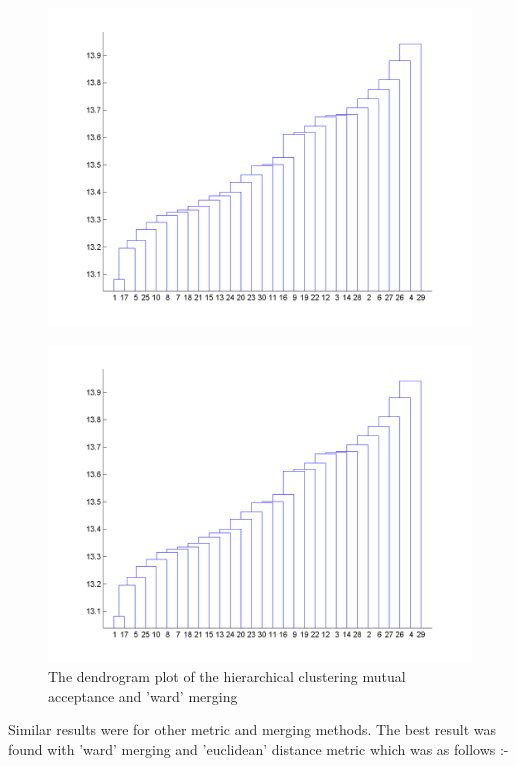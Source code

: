 \documentclass[11pt, twocolumn]{article}
\begin{document}
\begin{figure}[H]
\includegraphics[scale=0.3]{dendo_distance_coax.png}
\end{figure}
\begin{figure}[H]
\includegraphics[scale=0.3]{dendo_distance_coax.png}
\caption{The dendrogram plot of the hierarchical clustering mutual acceptance and 'ward' merging}
\end{figure}
Similar results were for other metric and merging methods. The best result was found with 'ward' merging and 'euclidean' distance metric which was as follows :-
\end{document}
